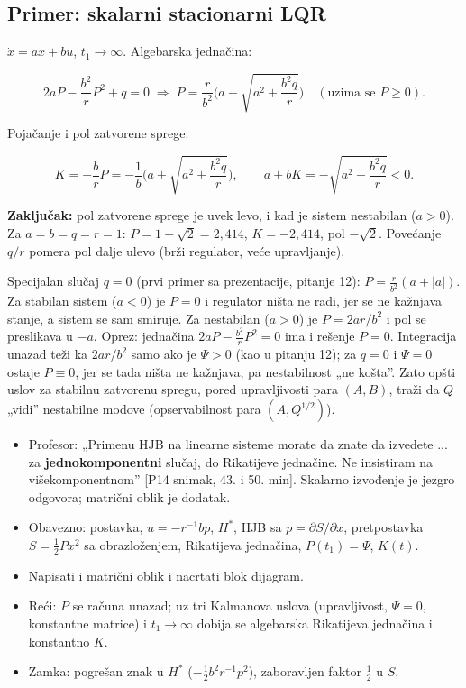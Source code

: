 \documentclass[11pt,a4paper,parskip=half,headsepline,numbers=noenddot]{scrartcl}
\DeclareRobustCommand{\izvor}[1]{{\small\color{izvorC}[#1]}}
\begin{document}
\subsection{Primer: skalarni stacionarni LQR}

\(\dot x = ax + bu\), \(t_1 \to \infty\). Algebarska jednačina:

\[2aP - \frac{b^2}{r}P^2 + q = 0 \;\Rightarrow\; P = \frac{r}{b^2}\Big(a + \sqrt{a^2 + \frac{b^2q}{r}}\Big) \quad(\text{uzima se } P \ge 0) .\]

Pojačanje i pol zatvorene sprege:

\[K = -\frac{b}{r}P = -\frac1b\Big(a + \sqrt{a^2 + \frac{b^2q}{r}}\Big), \qquad a + bK = -\sqrt{a^2 + \frac{b^2q}{r}} < 0 .\]

\textbf{Zaključak:} pol zatvorene sprege je uvek levo, i kad je sistem nestabilan (\(a > 0\)). Za \(a = b = q = r = 1\): \(P = 1 + \sqrt2 = 2{,}414\), \(K = -2{,}414\), pol \(-\sqrt2\). Povećanje \(q/r\) pomera pol dalje ulevo (brži regulator, veće upravljanje).

Specijalan slučaj \(q = 0\) (prvi primer sa prezentacije, pitanje 12): \(P = \frac{r}{b^2}(a + |a|)\). Za stabilan sistem (\(a < 0\)) je \(P = 0\) i regulator ništa ne radi, jer se ne kažnjava stanje, a sistem se sam smiruje. Za nestabilan (\(a > 0\)) je \(P = 2ar/b^2\) i pol se preslikava u \(-a\). Oprez: jednačina \(2aP - \frac{b^2}{r}P^2 = 0\) ima i rešenje \(P = 0\). Integracija unazad teži ka \(2ar/b^2\) samo ako je \(\Psi > 0\) (kao u pitanju 12); za \(q = 0\) i \(\Psi = 0\) ostaje \(P \equiv 0\), jer se tada ništa ne kažnjava, pa nestabilnost „ne košta''. Zato opšti uslov za stabilnu zatvorenu spregu, pored upravljivosti para \((A, B)\), traži da \(Q\) „vidi'' nestabilne modove (opservabilnost para \((A, Q^{1/2})\)).

\begin{ispit}[{Pitanje 10}]
\begin{itemize}
\item Profesor: „Primenu HJB na linearne sisteme morate da znate da izvedete ... za \textbf{jednokomponentni} slučaj, do Rikatijeve jednačine. Ne insistiram na višekomponentnom'' \izvor{P14 snimak, 43. i 50. min}. Skalarno izvođenje je jezgro odgovora; matrični oblik je dodatak.
\item Obavezno: postavka, \(u = -r^{-1}bp\), \(H^*\), HJB sa \(p = \partial S/\partial x\), pretpostavka \(S = \frac12Px^2\) sa obrazloženjem, Rikatijeva jednačina, \(P(t_1) = \Psi\), \(K(t)\).
\item Napisati i matrični oblik i nacrtati blok dijagram.
\item Reći: \(P\) se računa unazad; uz tri Kalmanova uslova (upravljivost, \(\Psi = 0\), konstantne matrice) i \(t_1 \to \infty\) dobija se algebarska Rikatijeva jednačina i konstantno \(K\).
\item Zamka: pogrešan znak u \(H^*\) (\(-\frac12b^2r^{-1}p^2\)), zaboravljen faktor \(\frac12\) u \(S\).
\end{itemize}
\end{ispit}
\end{document}
